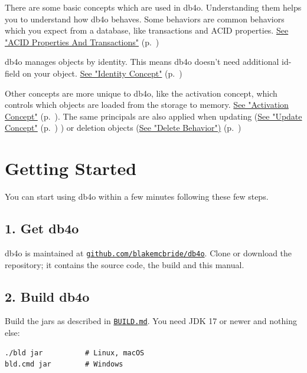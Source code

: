 There are some basic concepts which are used in db4o. Understanding them helps you to understand how db4o behaves. Some behaviors are common behaviors which you expect from a database, like transactions and ACID properties. \hyperref[ref:basics-acid-and-transactions]{See "ACID Properties And Transactions"} (p.~\pageref{ref:basics-acid-and-transactions})

db4o manages objects by identity. This means db4o doesn't need additional id-field on your object. \hyperref[ref:basics-identity-concept]{See "Identity Concept"} (p.~\pageref{ref:basics-identity-concept})

Other concepts are more unique to db4o, like the activation concept, which controls which objects are loaded from the storage to memory. \hyperref[ref:basics-activation]{See "Activation Concept"} (p.~\pageref{ref:basics-activation}). The same principals are also applied when updating (\hyperref[ref:basics-update-concept]{See "Update Concept"} (p.~\pageref{ref:basics-update-concept})  ) or deletion objects (\hyperref[ref:basics-delete-behavior]{See "Delete Behavior")} (p.~\pageref{ref:basics-delete-behavior})

\section{Getting Started}
\label{ref:basics-getting-started}

You can start using db4o within a few minutes following these few steps.

\subsection*{1. Get db4o}

db4o is maintained at \href{https://github.com/blakemcbride/db4o}{\nolinkurl{github.com/blakemcbride/db4o}}. Clone or download the repository; it contains the source code, the build and this manual.

\subsection*{2. Build db4o}

Build the jars as described in \href{https://github.com/blakemcbride/db4o/blob/master/BUILD.md}{\nolinkurl{BUILD.md}}. You need JDK 17 or newer and nothing else:

\begin{lstlisting}
./bld jar          # Linux, macOS
bld.cmd jar        # Windows
\end{lstlisting}

